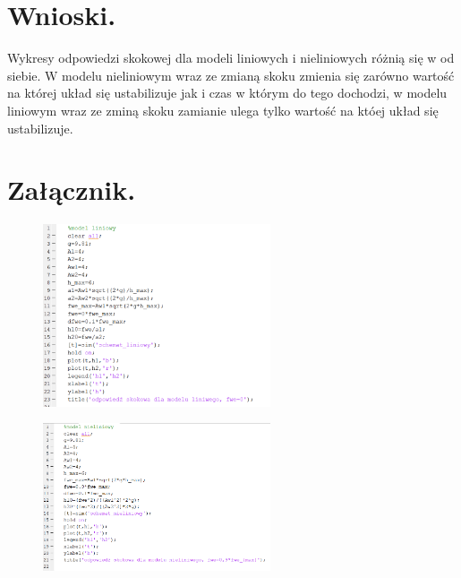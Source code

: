 \documentclass{article}
\begin{document}
\section{Wnioski.}
Wykresy odpowiedzi skokowej dla modeli liniowych i nieliniowych różnią się w od siebie. W modelu nieliniowym wraz ze zmianą skoku zmienia się zarówno wartość na której układ się ustabilizuje jak i czas w którym do tego dochodzi, w modelu liniowym wraz ze zminą skoku zamianie ulega tylko wartość na któej układ się ustabilizuje. 
\section{Załącznik.}
\begin{figure}[h!]
    \centering
    \includegraphics[width=0.6\textwidth]{kod1.png}
    \label{fig:my_label}
\end{figure}
\begin{figure}[h!]
    \centering
    \includegraphics[width=0.6\textwidth]{kod2.png}
    \label{fig:my_label}
\end{figure}
\end{document}
